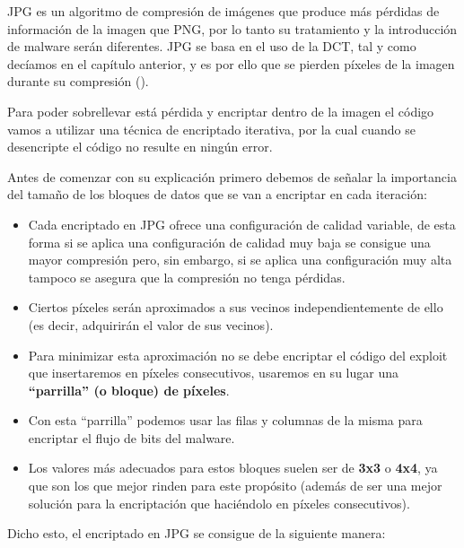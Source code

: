 JPG es un algoritmo de compresión de imágenes que produce más pérdidas de información de la imagen que PNG, por lo tanto su tratamiento y la introducción de malware serán diferentes. JPG se basa en el uso de la \ac{DCT}, tal y como decíamos en el capítulo anterior, y es por ello que se pierden píxeles de la imagen durante su compresión (\cite{dct}). %

Para poder sobrellevar está pérdida y encriptar dentro de la imagen el código vamos a utilizar una técnica de encriptado iterativa, por la cual cuando se desencripte el código no resulte en ningún error.

Antes de comenzar con su explicación primero debemos de señalar la importancia del tamaño de los bloques de datos que se van a encriptar en cada iteración: 

\begin{itemize}
\item Cada encriptado en JPG ofrece una configuración de calidad variable, de esta forma si se aplica una configuración de calidad muy baja se consigue una mayor compresión pero, sin embargo, si se aplica una configuración muy alta tampoco se asegura que la compresión no tenga pérdidas.
\item Ciertos píxeles serán aproximados a sus vecinos independientemente de ello (es decir, adquirirán el valor de sus vecinos).
\item Para minimizar esta aproximación no se debe encriptar el código del exploit que insertaremos en píxeles consecutivos, usaremos en su lugar una \textbf{``parrilla'' (o bloque) de píxeles}.
\item Con esta ``parrilla'' podemos usar las filas y columnas de la misma para encriptar el flujo de bits del malware.
\item Los valores más adecuados para estos bloques suelen ser de \textbf{3x3} o \textbf{4x4}, ya que son los que mejor rinden para este propósito (además de ser una mejor solución para la encriptación que haciéndolo en píxeles consecutivos).
\end{itemize}

Dicho esto, el encriptado en JPG se consigue de la siguiente manera:

